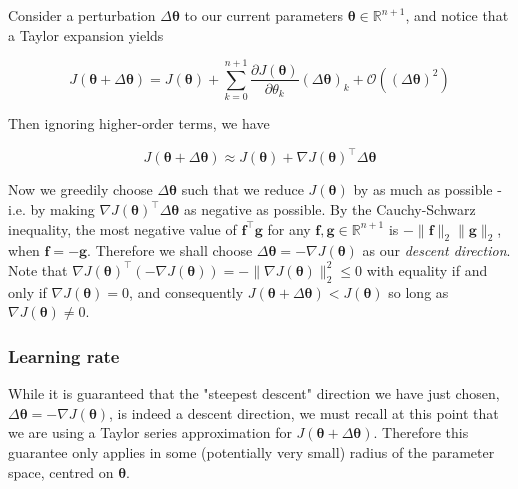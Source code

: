 \documentclass{article}[11pt]
\begin{document}
            Consider a perturbation $\Delta \boldsymbol{\theta}$ to our current parameters $\boldsymbol{\theta} \in \mathbb{R}^{n+1}$, and notice that a Taylor expansion yields
            
            $$
            J(\boldsymbol{\theta} + \Delta \boldsymbol{\theta}) = J(\boldsymbol{\theta}) + \sum_{k=0}^{n+1} \frac{\partial J(\boldsymbol{\theta})}{\partial \theta_k} (\Delta \boldsymbol{\theta})_k + \mathcal{O} ((\Delta \boldsymbol{\theta})^2)
            $$
            
            Then ignoring higher-order terms, we have
            
            $$
            J(\boldsymbol{\theta} + \Delta \boldsymbol{\theta}) \approx J(\boldsymbol{\theta}) + \nabla J(\boldsymbol{\theta})^\top \Delta \boldsymbol{\theta}
            $$
            
            Now we greedily choose $\Delta \boldsymbol{\theta}$ such that we reduce $J(\boldsymbol{\theta})$ by as much as possible - i.e. by making $\nabla J(\boldsymbol{\theta})^\top \Delta \boldsymbol{\theta}$ as negative as possible. By the Cauchy-Schwarz inequality, the most negative value of $\mathbf{f}^\top \mathbf{g}$ for any $\mathbf{f}, \mathbf{g} \in \mathbb{R}^{n+1}$ is $- \lVert \mathbf{f} \rVert_2 \lVert \mathbf{g} \rVert_2$, when $\mathbf{f} = -\mathbf{g}$. Therefore we shall choose $\Delta \boldsymbol{\theta} = - \nabla J(\boldsymbol{\theta})$ as our \textit{descent direction}. Note that $\nabla J(\boldsymbol{\theta})^\top (- \nabla J(\boldsymbol{\theta})) = -\lVert \nabla J(\boldsymbol{\theta}) \rVert_2^2 \leq 0$ with equality if and only if $\nabla J(\boldsymbol{\theta}) = 0$, and consequently $J(\boldsymbol{\theta} + \Delta \boldsymbol{\theta}) < J(\boldsymbol{\theta})$ so long as $\nabla J(\boldsymbol{\theta}) \neq 0$.
        
    
    
        \subsubsection{Learning rate}
            
            While it is guaranteed that the "steepest descent" direction we have just chosen, $\Delta \boldsymbol{\theta} = - \nabla J(\boldsymbol{\theta})$, is indeed a descent direction, we must recall at this point that we are using a Taylor series approximation for $J(\boldsymbol{\theta} + \Delta \boldsymbol{\theta})$. Therefore this guarantee only applies in some (potentially very small) radius of the parameter space, centred on $\boldsymbol{\theta}$.
            
\end{document}
